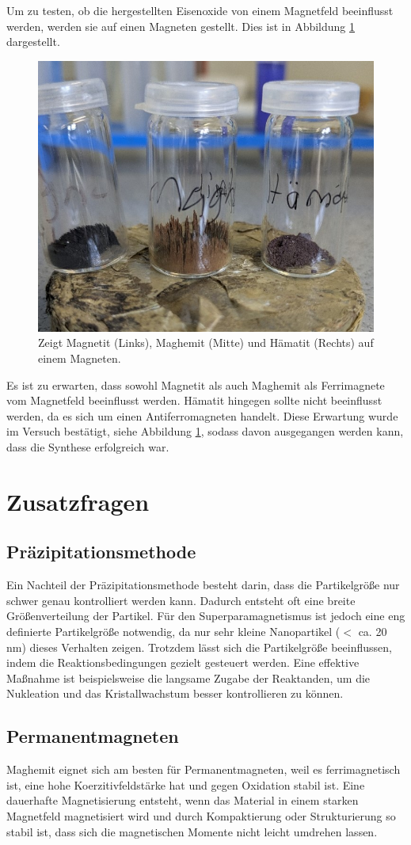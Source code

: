 \documentclass[12pt, a4paper]{article}
\begin{document}
Um zu testen, ob die hergestellten Eisenoxide von einem Magnetfeld beeinflusst werden, werden sie auf einen Magneten gestellt. Dies ist in Abbildung \ref{testmagnet} dargestellt.
\begin{figure}[!h]
    \centering
    \includegraphics[width=0.5\linewidth]{testmagnet.jpg}
    \caption{Zeigt Magnetit (Links), Maghemit (Mitte) und Hämatit (Rechts) auf einem Magneten.}
    \label{testmagnet}
\end{figure}

\noindent
Es ist zu erwarten, dass sowohl Magnetit als auch Maghemit als Ferrimagnete vom Magnetfeld beeinflusst werden. Hämatit hingegen sollte nicht beeinflusst werden, da es sich um einen Antiferromagneten handelt. Diese Erwartung wurde im Versuch bestätigt, siehe Abbildung \ref{testmagnet}, sodass davon ausgegangen werden kann, dass die Synthese erfolgreich war.

\newpage

\section{Zusatzfragen}
\subsection{Präzipitationsmethode}
Ein Nachteil der Präzipitationsmethode besteht darin, dass die Partikelgröße nur schwer genau kontrolliert werden kann. Dadurch entsteht oft eine breite Größenverteilung der Partikel. Für den Superparamagnetismus ist jedoch eine eng definierte Partikelgröße notwendig, da nur sehr kleine Nanopartikel ($<$ ca. 20 nm) dieses Verhalten zeigen.
Trotzdem lässt sich die Partikelgröße beeinflussen, indem die Reaktionsbedingungen gezielt gesteuert werden. Eine effektive Maßnahme ist beispielsweise die langsame Zugabe der Reaktanden, um die Nukleation und das Kristallwachstum besser kontrollieren zu können.

\subsection{Permanentmagneten}
Maghemit eignet sich am besten für Permanentmagneten, weil es ferrimagnetisch ist, eine hohe Koerzitivfeldstärke hat und gegen Oxidation stabil ist.
Eine dauerhafte Magnetisierung entsteht, wenn das Material in einem starken Magnetfeld magnetisiert wird und durch Kompaktierung oder Strukturierung so stabil ist, dass sich die magnetischen Momente nicht leicht umdrehen lassen.
\end{document}
